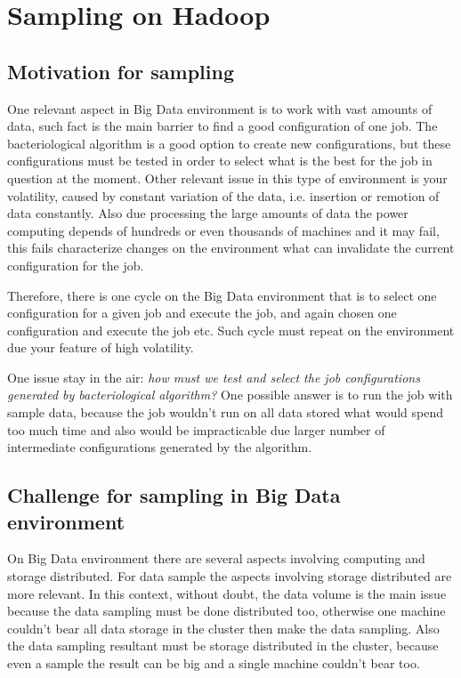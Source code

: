 \chapter{Sampling on Hadoop} %
\label{cha:sample}

\section{Motivation for sampling}

One relevant aspect in Big Data environment is to work with vast amounts of data,
such fact is the main barrier to find a good configuration of one job. The bacteriological
algorithm is a good option to create new configurations, but these configurations
must be tested in order to select what is the best for the job in question at the
moment. Other relevant issue in this type of environment is your volatility, caused
by constant variation of the data, i.e. insertion or remotion of data constantly.
Also due processing the large amounts of data the power computing depends of hundreds
or even thousands of machines and it may fail, this fails characterize changes on
the environment what can invalidate the current configuration for the job.

Therefore, there is one cycle on the Big Data environment that is to select one
configuration for a given job and execute the job, and again chosen one configuration
and execute the job etc. Such cycle must repeat on the environment due your feature
of high volatility.

One issue stay in the air: {\it how must we test and select the job configurations
generated by bacteriological algorithm?} One possible answer is to run the job with
sample data, because the job wouldn't run on all data stored what would spend too
much time and also would be impracticable due larger number of intermediate
configurations generated by the algorithm.

\section{Challenge for sampling in Big Data environment}

On Big Data environment there are several aspects involving computing and storage
distributed. For data sample the aspects involving storage distributed are more
relevant. In this context, without doubt, the data volume is the main issue because
the data sampling must be done distributed too, otherwise one machine couldn't bear
all data storage in the cluster then make the data sampling. Also the data sampling
resultant must be storage distributed in the cluster, because even a sample the
result can be big and a single machine couldn't bear too.

